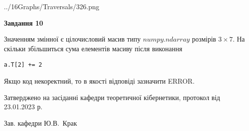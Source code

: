 \documentclass[12pt, ukrainian]{article}
\begin{document}
{\begin {large}
\begin{center}
	{../16Graphs/Traversals/326.png}
\end{center}\par
\newpage

{\begin {center}\textbf{Завдання 10}\end {center}}\par
Значенням змінної  є цілочисловий масив типу $numpy.ndarray$ розмірів $3{\times}7$. На скільки збільшиться сума елементів масиву  після виконання
\begin{verbatim}
a.T[2] += 2
\end{verbatim}


Якщо код некоректний, то в якості відповіді зазначити ERROR.\par
\newpage


\end {large}
}
{\smallskip \begin {small} Затверджено на засіданні кафедри теоретичної кібернетики, протокол  від   23.01.2023 р.\par\smallskip\smallskip
{\parbox {6.5 cm}{Зав. кафедри \dotfill Ю.В.~Крак}} \end{small}}
\end{document}
